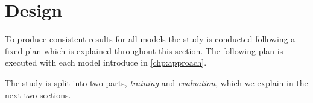 \section{Design}
\label{chp:study:sec:design}
To produce consistent results for all models the study is conducted following a fixed plan which is explained throughout this section.
The following plan is executed with each model introduce in \cref{chp:approach}.

The study is split into two parts, \textit{training} and \textit{evaluation}, which we explain in the next two sections.



